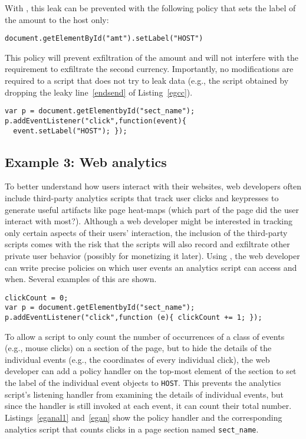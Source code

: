 With {\sys}, this leak can be prevented with the following policy that
sets the label of the amount to the host only:

\medskip
\texttt{document.getElementById("amt").setLabel("HOST")}

\medskip
\noindent This policy will prevent exfiltration of the amount and will not
interfere with the requirement to exfiltrate the second
currency. Importantly, no modifications are required to a script that
does not try to leak data (e.g., the script obtained by dropping the
leaky line~\ref{endsend} of Listing~\ref{egcc}).

\begin{lstlisting}[float,caption=Policy that allows counting clicks but hides details of the clicks,label=eganal1]
var p = document.getElementbyId("sect_name");
p.addEventListener("click",function(event){
  event.setLabel("HOST"); });
\end{lstlisting}

\subsection{Example 3: Web analytics} 
To better understand how
users interact with their websites, web developers often include
third-party analytics scripts that track user clicks and keypresses to
generate useful artifacts like page heat-maps (which part of the page
did the user interact with most?). Although a web developer might be
interested in tracking only certain aspects of their users'
interaction, the inclusion of the third-party scripts comes with the
risk that the scripts will also record and exfiltrate other private
user behavior (possibly for monetizing it later). Using {\sys}, the
web developer can write precise policies on which user events an
analytics script can access and when. Several examples of this are
shown. 

\begin{lstlisting}[float, caption=Analytics script that counts clicks,label=egan]
clickCount = 0;
var p = document.getElementbyId("sect_name");  
p.addEventListener("click",function (e){ clickCount += 1; });
\end{lstlisting}

To allow a script to only count the number of occurrences of a class
of events (e.g., mouse clicks) on a section of the page, but to hide
the details of the individual events (e.g., the coordinates of every
individual click), the web developer can add a policy handler on the
top-most element of the section to set the label of the individual
event objects to \texttt{HOST}. This prevents the analytics script's
listening handler from examining the details of individual events, but
since the handler is still invoked at each event, it can count their
total number. Listings~\ref{eganal1} and~\ref{egan} show the policy
handler and the corresponding analytics script that counts clicks in a
page section named \texttt{sect\_name}.


